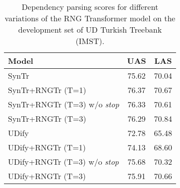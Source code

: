 \begin{table}[tb]
\centering
  \begin{adjustbox}{width=\linewidth}
    \begin{tabular}{|l|c|c|}
    \hline
    Model & UAS & LAS\\
    \hline
     SynTr & 75.62 & 70.04 \\
     SynTr+RNGTr (T=1) & 76.37 & 70.67 \\
     SynTr+RNGTr (T=3) w/o \textit{stop} & 76.33 & 70.61  \\
     SynTr+RNGTr (T=3) & 76.29 & 70.84  \\ 
    \hline
     UDify~\cite{Kondratyuk_2019} & 72.78 & 65.48 \\
     UDify+RNGTr (T=1) & 74.13 & 68.60 \\
     UDify+RNGTr (T=3) w/o \textit{stop} & 75.68 & 70.32 \\
     UDify+RNGTr (T=3) & 75.91 & 70.66 \\
    \hline
    
    \end{tabular}
  \end{adjustbox}
\caption{\label{result-turkish} Dependency parsing scores for different variations of the RNG Transformer model on the development set of UD Turkish Treebank (IMST).}
\end{table}

